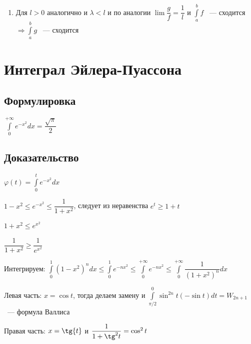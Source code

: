 \documentclass{article}
\begin{document}
\begin{enumerate}
\begin{itemize}
\begin{enumerate}
                                \item Для $l > 0$ аналогично и $\lambda < l$ и по аналогии $\lim \dfrac{g}{f} = \dfrac{1}{l}$ и $\int\limits^b_a f$ ~--- сходится $\Rightarrow \int\limits^b_a g$ ~--- сходится
                                
                            \end{enumerate}
                        
                    \end{itemize}
                
            \end{enumerate}
    
    \newpage
    
    \section{Интеграл Эйлера-Пуассона}
    
        \subsection{Формулировка}
        
            $\int\limits^{+\infty}_0 e^{-x^2} dx = \dfrac{\sqrt{\pi}}{2}$
            
        \subsection{Доказательство}
        
            $\varphi(t) = \int\limits^t_0 e^{-x^2} dx$
            
            $1 - x^2 \leq e^{-x^2} \leq \dfrac{1}{1 + x^2}$, следует из неравенства $e^t \geq 1 + t$
            
            $1 + x^2 \leq e^{x^2}$
            
            $\dfrac{1}{1 + x^2} \geq \dfrac{1}{e^{x^2}}$
            
            Интегрируем: $\int\limits^1_0 (1 - x^2)^n dx \leq \int\limits^1_0 e^{-nx^2} \leq \int\limits^{+\infty}_0 e^{-nx^2} \leq \int\limits^{+\infty}_{0} \dfrac{1}{(1 + x^2)^n} dx$
            
            Левая часть: $x = \cos{t}$, тогда делаем замену и $\int\limits^0_{\pi / 2} \sin^{2n} {t} (-\sin{t}) dt = W_{2n + 1}$ ~--- формула Валлиса
            
            Правая часть: $x = \tg {t}$ и $\dfrac{1}{1 + \tg^2{t}} = \cos^2{t}$
            
\end{document}
